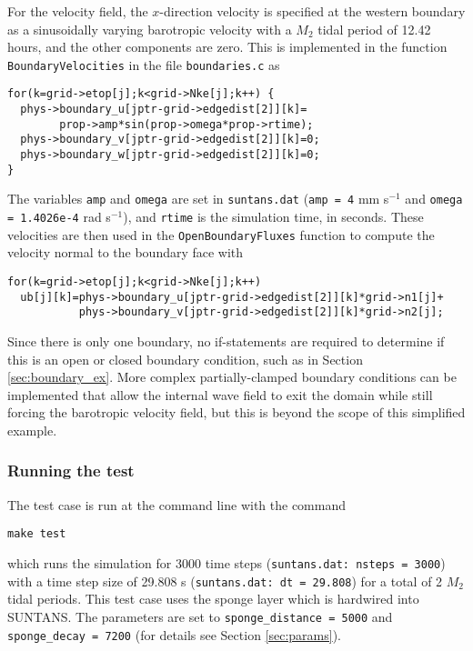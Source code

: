 For the velocity field, the $x$-direction velocity is specified at the western boundary
as a sinusoidally varying barotropic velocity with a $M_2$ tidal period of 12.42 hours,
and the other components are zero.  This is implemented in the function \verb+BoundaryVelocities+
in the file \verb+boundaries.c+ as
\begin{verbatim}
for(k=grid->etop[j];k<grid->Nke[j];k++) {
  phys->boundary_u[jptr-grid->edgedist[2]][k]=
        prop->amp*sin(prop->omega*prop->rtime);
  phys->boundary_v[jptr-grid->edgedist[2]][k]=0;
  phys->boundary_w[jptr-grid->edgedist[2]][k]=0;
}
\end{verbatim}
The variables \verb+amp+ and \verb+omega+ are set in \verb+suntans.dat+ 
(\verb+amp = 4+ mm s$^{-1}$ and \verb+omega = 1.4026e-4+ rad s$^{-1}$),
and \verb+rtime+ is the simulation time, in seconds.  These velocities are
then used in the \verb+OpenBoundaryFluxes+ function to compute the velocity normal
to the boundary face with 
\begin{verbatim}
for(k=grid->etop[j];k<grid->Nke[j];k++) 
  ub[j][k]=phys->boundary_u[jptr-grid->edgedist[2]][k]*grid->n1[j]+
           phys->boundary_v[jptr-grid->edgedist[2]][k]*grid->n2[j];
\end{verbatim}
Since there is only one boundary, no if-statements are required to determine if
this is an open or closed boundary condition, such as in Section \ref{sec:boundary_ex}.
More complex partially-clamped boundary conditions can be implemented that allow the internal wave
field to exit the domain while still forcing the barotropic velocity field, but this is
beyond the scope of this simplified example.

\subsubsection{Running the test}

The test case is run at the command line with the command
\begin{verbatim}
make test
\end{verbatim}
which runs the simulation for 3000 time steps (\verb+suntans.dat: nsteps = 3000+)
with a time step size of 29.808 s (\verb+suntans.dat: dt = 29.808+) for a total of
2 $M_2$ tidal periods.  This test case uses the sponge layer which is hardwired into
SUNTANS.  The parameters are set to \verb+sponge_distance = 5000+ and 
\verb+sponge_decay = 7200+ (for details see Section \ref{sec:params}).

